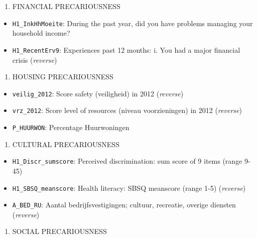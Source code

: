 \documentclass[
]{article}
\providecommand{\tightlist}{%
  \setlength{\itemsep}{0pt}\setlength{\parskip}{0pt}}\usepackage{longtable,booktabs,array}
\begin{document}
\begin{enumerate}
\def\labelenumi{\arabic{enumi}.}
\setcounter{enumi}{1}
\tightlist
\item
  FINANCIAL PRECARIOUSNESS
\end{enumerate}

\begin{itemize}
\tightlist
\item
  \texttt{H1\_InkHhMoeite}: During the past year, did you have problems
  managing your household income?
\item
  \texttt{H1\_RecentErv9}: Experiences past 12 months: i. You had a
  major financial crisis (\emph{reverse})
\end{itemize}

\begin{enumerate}
\def\labelenumi{\arabic{enumi}.}
\setcounter{enumi}{2}
\tightlist
\item
  HOUSING PRECARIOUSNESS
\end{enumerate}

\begin{itemize}
\tightlist
\item
  \texttt{veilig\_2012}: Score safety (veiligheid) in 2012
  (\emph{reverse})
\item
  \texttt{vrz\_2012}: Score level of resources (niveau voorzieningen) in
  2012 (\emph{reverse})
\item
  \texttt{P\_HUURWON}: Percentage Huurwoningen
\end{itemize}

\begin{enumerate}
\def\labelenumi{\arabic{enumi}.}
\setcounter{enumi}{3}
\tightlist
\item
  CULTURAL PRECARIOUSNESS
\end{enumerate}

\begin{itemize}
\tightlist
\item
  \texttt{H1\_Discr\_sumscore}: Perceived discrimination: sum score of 9
  items (range 9-45)
\item
  \texttt{H1\_SBSQ\_meanscore}: Health literacy: SBSQ meanscore (range
  1-5) (\emph{reverse})
\item
  \texttt{A\_BED\_RU}: Aantal bedrijfsvestigingen; cultuur, recreatie,
  overige diensten (\emph{reverse})
\end{itemize}

\begin{enumerate}
\def\labelenumi{\arabic{enumi}.}
\setcounter{enumi}{4}
\tightlist
\item
  SOCIAL PRECARIOUSNESS
\end{enumerate}
\end{document}
